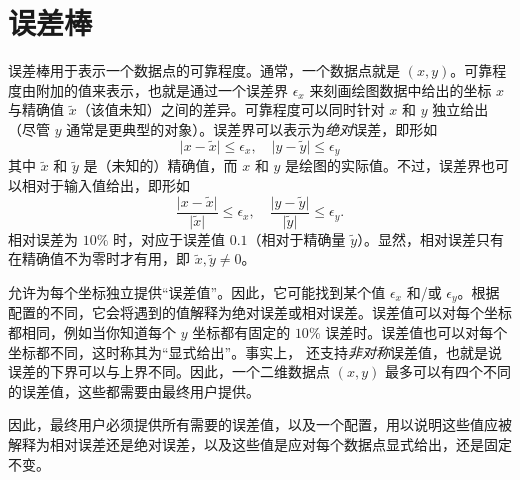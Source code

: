 
\section{误差棒}
\label{sec:errorbars}

{
\def\pgfplotserror#1{\ensuremath{\epsilon_{#1}}}

误差棒用于表示一个数据点的可靠程度。通常，一个数据点就是 $(x,y)$。可靠程度由附加的值来表示，也就是通过一个误差界 $\pgfplotserror{x}$ 来刻画绘图数据中给出的坐标 $x$ 与精确值 $\tilde x$（该值未知）之间的差异。可靠程度可以同时针对 $x$ 和 $y$ 独立给出（尽管 $y$ 通常是更典型的对象）。误差界可以表示为\emph{绝对}误差，即形如
%
    \begin{equation*}
        \lvert{x-\tilde x}\rvert \le \pgfplotserror{x}, \quad
        \lvert{y-\tilde y}\rvert \le \pgfplotserror{y}
    \end{equation*}
%
其中 $\tilde x$ 和 $\tilde y$ 是（未知的）精确值，而 $x$ 和 $y$ 是绘图的实际值。不过，误差界也可以相对于输入值给出，即形如
%
    \begin{equation*}
        \frac{\lvert{x-\tilde x}\rvert} {\lvert\tilde x\rvert} \le \pgfplotserror{x},
            \quad
        \frac{\lvert{y-\tilde y}\rvert} {\lvert\tilde y\rvert} \le \pgfplotserror{y}.
    \end{equation*}
%
相对误差为 $10\%$ 时，对应于误差值 $0.1$（相对于精确量 $\tilde y$）。显然，相对误差只有在精确值不为零时才有用，即 $\tilde x, \tilde y \neq 0$。

\PGFPlots{} 允许为每个坐标独立提供“误差值”。因此，它可能找到某个值 $\pgfplotserror{x}$ 和/或 $\pgfplotserror{y}$。根据配置的不同，它会将遇到的值解释为绝对误差或相对误差。误差值可以对每个坐标都相同，例如当你知道每个 $y$ 坐标都有固定的 $10\%$ 误差时。误差值也可以对每个坐标都不同，这时称其为“显式给出”。事实上，\PGFPlots{} 还支持\emph{非对称}误差值，也就是说误差的下界可以与上界不同。因此，一个二维数据点 $(x,y)$ 最多可以有四个不同的误差值，这些都需要由最终用户提供。

因此，最终用户必须提供所有需要的误差值，以及一个配置，用以说明这些值应被解释为相对误差还是绝对误差，以及这些值是应对每个数据点显式给出，还是固定不变。

\begin{codeexample}[]
\end{codeexample}

}

